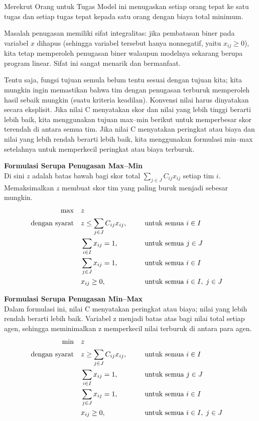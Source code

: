 \begin{examplewithallcode}{Merekrut Orang untuk Tugas}
Model ini menugaskan setiap orang tepat ke satu tugas dan setiap tugas tepat kepada satu orang dengan biaya total minimum.

\end{examplewithallcode}

Masalah penugasan memiliki sifat integralitas: jika pembatasan biner pada variabel $x$ dihapus (sehingga variabel tersebut hanya nonnegatif, yaitu $x_{ij} \ge 0$), kita tetap memperoleh penugasan biner walaupun modelnya sekarang berupa program linear. Sifat ini sangat menarik dan bermanfaat. 

Tentu saja, fungsi tujuan semula belum tentu sesuai dengan tujuan kita; kita mungkin ingin memastikan bahwa tim dengan penugasan terburuk memperoleh hasil sebaik mungkin (suatu kriteria keadilan). Konvensi nilai harus dinyatakan secara eksplisit. Jika nilai C menyatakan skor dan nilai yang lebih tinggi berarti lebih baik, kita menggunakan tujuan max–min berikut untuk memperbesar skor terendah di antara semua tim. Jika nilai C menyatakan peringkat atau biaya dan nilai yang lebih rendah berarti lebih baik, kita menggunakan formulasi min–max setelahnya untuk memperkecil peringkat atau biaya terburuk.

\medskip \textbf{Formulasi Serupa Penugasan Max–Min} \\
Di sini $z$ adalah batas bawah bagi skor total $\sum_{j \in J} C_{ij} x_{ij}$ setiap tim $i$. Memaksimalkan $z$ membuat skor tim yang paling buruk menjadi sebesar mungkin.
\begin{align*}
\max \quad & z  \nonumber \\
\mbox{dengan syarat}\quad        & z \leq \sum_{j \in J} C_{i j} x_{i j},~~ &&\quad \mbox{untuk semua } i \in I \\
   & \sum_{i \in I} x_{i j} = 1,~~ &&\quad \mbox{untuk semua } j \in J \\
         & \sum_{j \in J} x_{i j} = 1,~~ &&\quad \mbox{untuk semua } i \in I \\
         & x_{i j} \ge 0,~~ &&\quad \mbox{untuk semua } i \in I, \; j \in J
\end{align*}

\medskip \textbf{Formulasi Serupa Penugasan Min–Max} \\
Dalam formulasi ini, nilai C menyatakan peringkat atau biaya; nilai yang lebih rendah berarti lebih baik. Variabel z menjadi batas atas bagi nilai total setiap agen, sehingga meminimalkan z memperkecil nilai terburuk di antara para agen.
\begin{align*}
\min \quad & z  \nonumber \\
\mbox{dengan syarat}\quad        & z \geq \sum_{j \in J} C_{i j} x_{i j},~~ &&\quad \mbox{untuk semua } i \in I \\
   & \sum_{i \in I} x_{i j} = 1,~~ &&\quad \mbox{untuk semua } j \in J \\
         & \sum_{j \in J} x_{i j} = 1,~~ &&\quad \mbox{untuk semua } i \in I \\
         & x_{i j} \ge 0,~~ &&\quad \mbox{untuk semua } i \in I, \; j \in J
\end{align*}

